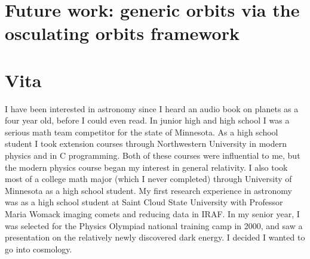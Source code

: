 \documentclass[12pt,letterpaper]{lsuetd}
\begin{document}
\chapter{Future work: generic orbits via the osculating orbits framework}
\doublespacing

\pagebreak
\singlespacing
\begin{thebibliography}{999}
\vspace{0.9em}

\end{thebibliography}
%
%

\chapter*{Vita}
\doublespacing
\setlength{\parindent}{1.75em}
\vspace{0.2em}
I have been interested in astronomy since I heard an audio book on planets as a four year old, before I could even read. In junior high and high school I was a serious math team competitor for the state of Minnesota. As a high school student I took extension courses through Northwestern University in modern physics and in C programming. Both of these courses were influential to me, but the modern physics course began my interest in general relativity. I also took most of a college math major (which I never completed) through University of Minnesota as a high school student. My first research experience in astronomy was as a high school student at Saint Cloud State University with Professor Maria Womack imaging comets and reducing data in IRAF. In my senior year, I was selected for the Physics Olympiad national training camp in 2000, and saw a presentation on the relatively newly discovered dark energy. I decided I wanted to go into cosmology.
\end{document}
